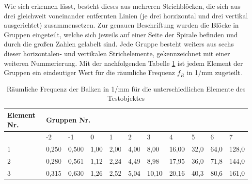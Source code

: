 \documentclass[12pt,a4paper,twoside]{article}
\begin{document}
\noindent
Wie sich erkennen lässt, besteht dieses aus mehreren Strichblöcken, die sich aus drei gleichweit voneinander entfernten Linien (je drei horzizontal und drei vertikal ausgerichtet) zusammensetzen.
Zur genauen Beschriftung wurden die Blöcke in Gruppen eingeteilt, welche sich jeweils auf einer Seite der Spirale befinden und durch die großen Zahlen gelabelt sind. Jede Gruppe besteht weiters aus sechs dieser horizontalen- und vertikalen Strichelemente, gekennzeichnet mit einer weiteren Nummerierung.
Mit der nachfolgenden Tabelle \ref{tab:fR-Tabelle} ist jedem Element der Gruppen ein eindeutiger Wert für die räumliche Frequenz $f_{R}$ in 1/mm zugeteilt.

\begin{table}[H]
    \centering
    \caption{Räumliche Frequenz der Balken in 1/mm für die unterschiedlichen Elemente des Testobjektes \cite{teachcenter2}}
    \label{tab:fR-Tabelle}
    \begin{tabular}{|l|llllllllll|}
    \hline
    Element Nr. & \multicolumn{10}{l|}{Gruppen Nr.}                                                                                                                                                                                                                                      \\ \hline
                & \multicolumn{1}{l|}{-2}    & \multicolumn{1}{l|}{-1}    & \multicolumn{1}{l|}{0}    & \multicolumn{1}{l|}{1}    & \multicolumn{1}{l|}{2}    & \multicolumn{1}{l|}{3}     & \multicolumn{1}{l|}{4}     & \multicolumn{1}{l|}{5}    & \multicolumn{1}{l|}{6}     & 7     \\ \hline
    1           & \multicolumn{1}{l|}{0,250} & \multicolumn{1}{l|}{0,500} & \multicolumn{1}{l|}{1,00} & \multicolumn{1}{l|}{2,00} & \multicolumn{1}{l|}{4,00} & \multicolumn{1}{l|}{8,00}  & \multicolumn{1}{l|}{16,00} & \multicolumn{1}{l|}{32,0} & \multicolumn{1}{l|}{64,0}  & 128,0 \\ \hline
    2           & \multicolumn{1}{l|}{0,280} & \multicolumn{1}{l|}{0,561} & \multicolumn{1}{l|}{1,12} & \multicolumn{1}{l|}{2,24} & \multicolumn{1}{l|}{4,49} & \multicolumn{1}{l|}{8,98}  & \multicolumn{1}{l|}{17,95} & \multicolumn{1}{l|}{36,0} & \multicolumn{1}{l|}{71,8}  & 144,0 \\ \hline
    3           & \multicolumn{1}{l|}{0,315} & \multicolumn{1}{l|}{0,630} & \multicolumn{1}{l|}{1,26} & \multicolumn{1}{l|}{2,52} & \multicolumn{1}{l|}{5,04} & \multicolumn{1}{l|}{10,10} & \multicolumn{1}{l|}{20,16} & \multicolumn{1}{l|}{40,3} & \multicolumn{1}{l|}{80,6}  & 161,0 \\ \hline

\end{tabular}
\end{table}
\end{document}
